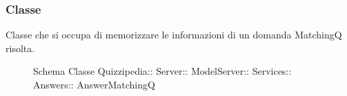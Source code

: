 \subsubsection{Classe }
Classe che si occupa di memorizzare le informazioni di un domanda MatchingQ risolta.
\begin{figure}[H]
\centering
\noindent{}
\caption[Schema Classe AnswerMatchingQ]{Schema Classe Quizzipedia:: Server:: ModelServer:: Services:: Answers:: AnswerMatchingQ}
\end{figure}
